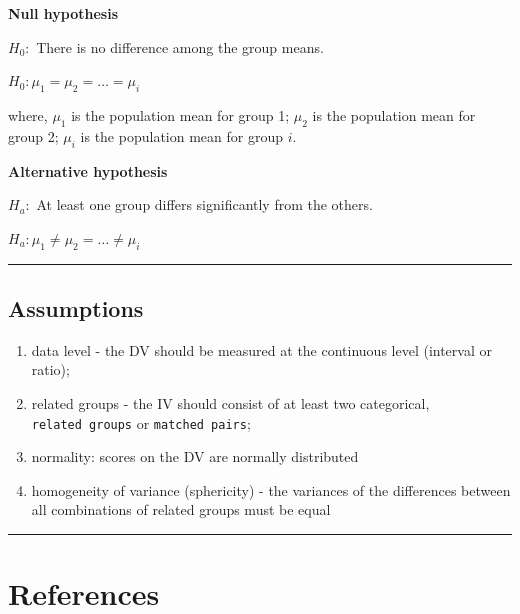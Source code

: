 \documentclass[
]{article}
\providecommand{\tightlist}{%
  \setlength{\itemsep}{0pt}\setlength{\parskip}{0pt}}
\begin{document}
\textbf{Null hypothesis}

\(H_0:\) There is no difference among the group means.

\(H_0:\mu_1 = \mu_2 = \ldots = \mu_i\)

where, \(\mu_1\) is the population mean for group 1; \(\mu_2\) is the population mean for group 2; \(\mu_i\) is the population mean for group \(i\).

\textbf{Alternative hypothesis}

\(H_a:\) At least one group differs significantly from the others.

\(H_a:\mu_1 \neq \mu_2 = \ldots \neq \mu_i\)

\begin{center}\rule{0.5\linewidth}{0.5pt}\end{center}

\hypertarget{assumptions-1}{%
\subsection{Assumptions}\label{assumptions-1}}

\begin{enumerate}
\def\labelenumi{\arabic{enumi}.}
\tightlist
\item
  data level - the DV should be measured at the continuous level (interval or ratio);
\item
  related groups - the IV should consist of at least two categorical, \texttt{related\ groups} or \texttt{matched\ pairs};
\item
  normality: scores on the DV are normally distributed
\item
  homogeneity of variance (sphericity) - the variances of the differences between all combinations of related groups must be equal
\end{enumerate}

\begin{center}\rule{0.5\linewidth}{0.5pt}\end{center}

\hypertarget{references}{%
\section{References}\label{references}}
\end{document}
